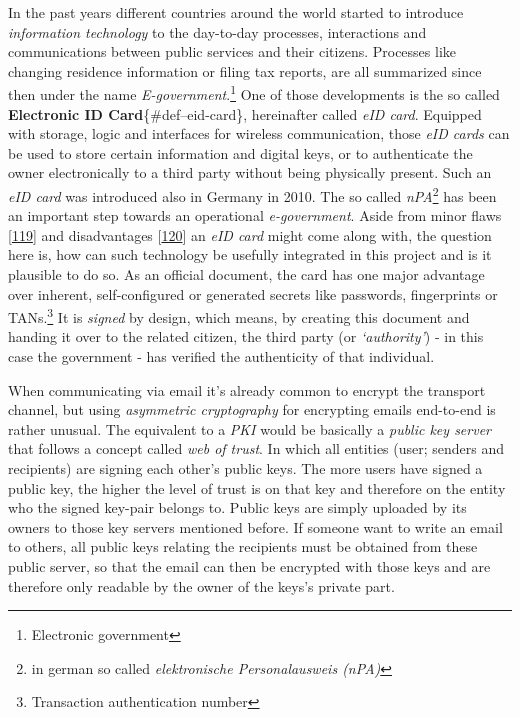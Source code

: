 \documentclass[12pt,english,a4paper,titlepage,cleardoublepage=empty,dottedtoc]{report}
\begin{document}
In the past years different countries around the world started to
introduce \emph{information technology} to the day-to-day processes,
interactions and communications between public services and their
citizens. Processes like changing residence information or filing tax
reports, are all summarized since then under the name
\emph{E-government}.\footnote{Electronic government} One of those
developments is the so called \textbf{Electronic ID
Card}\{\#def--eid-card\}, hereinafter called \emph{eID card}. Equipped
with storage, logic and interfaces for wireless communication, those
\emph{eID cards} can be used to store certain information and digital
keys, or to authenticate the owner electronically to a third party
without being physically present. Such an \emph{eID card} was introduced
also in Germany in 2010. The so called \emph{nPA}\footnote{in german so
  called \emph{elektronische Personalausweis (nPA)}} has been an
important step towards an operational \emph{e-government}. Aside from
minor flaws
{[}\protect\hyperlink{ref-web_2013_npa-sicherheitsdefizit}{119}{]} and
disadvantages
{[}\protect\hyperlink{ref-web_2014_test-qes-support-in-npa}{120}{]} an
\emph{eID card} might come along with, the question here is, how can
such technology be usefully integrated in this project and is it
plausible to do so. As an official document, the card has one major
advantage over inherent, self-configured or generated secrets like
passwords, fingerprints or TANs.\footnote{Transaction authentication
  number} It is \emph{signed} by design, which means, by creating this
document and handing it over to the related citizen, the third party (or
\emph{`authority'}) - in this case the government - has verified the
authenticity of that individual.

When communicating via email it's already common to encrypt the
transport channel, but using \emph{asymmetric cryptography} for
encrypting emails end-to-end is rather unusual. The equivalent to a
\emph{PKI} would be basically a \emph{public key server} that follows a
concept called \emph{web of trust}. In which all entities (user; senders
and recipients) are signing each other's public keys. The more users
have signed a public key, the higher the level of trust is on that key
and therefore on the entity who the signed key-pair belongs to. Public
keys are simply uploaded by its owners to those key servers mentioned
before. If someone want to write an email to others, all public keys
relating the recipients must be obtained from these public server, so
that the email can then be encrypted with those keys and are therefore
only readable by the owner of the keys's private part.
\end{document}
